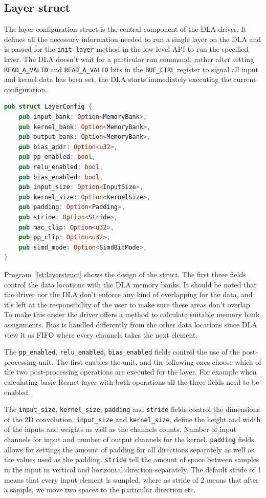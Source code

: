 \documentclass[12pt,a4paper,english
]{tunithesis}
\begin{document}
\subsection{Layer struct}
The layer configuration struct is the central component of the DLA driver. It defines all the necessary information needed to run a single layer on the DLA and is passed for the \texttt{init\_layer} method in the low level API to run the specified layer. The DLA doesn't wait for a particular run command, rather after setting \texttt{READ\_A\_VALID} and \texttt{READ\_A\_VALID} bits in the \texttt{BUF\_CTRL} register to signal all input and kernel data has been set, the DLA starts immediately executing the current configuration.

\begin{lstlisting}[language=Rust, basicstyle=\footnotesize, caption={Example call to DLA highlevel API}, label={lst:layerstruct}]
pub struct LayerConfig {
    pub input_bank: Option<MemoryBank>,
    pub kernel_bank: Option<MemoryBank>,
    pub output_bank: Option<MemoryBank>,
    pub bias_addr: Option<u32>,
    pub pp_enabled: bool,
    pub relu_enabled: bool,
    pub bias_enabled: bool,
    pub input_size: Option<InputSize>,
    pub kernel_size: Option<KernelSize>,
    pub padding: Option<Padding>,
    pub stride: Option<Stride>,
    pub mac_clip: Option<u32>,
    pub pp_clip: Option<u32>,
    pub simd_mode: Option<SimdBitMode>,
}
\end{lstlisting}

Program~\ref{lst:layerstruct} shows the design of the struct. The first three fields control the data locations with the DLA memory banks. It should be noted that the driver nor the DLA don't enforce any kind of overlapping for the data, and it's left at the responsibility of the user to make sure these areas don't overlap. To make this easier the driver offers a method to calculate suitable memory bank assignments. Bias is handled differently from the other data locations since DLA view it as FIFO where every channels takes the next element.

The \texttt{pp\_enabled}, \texttt{relu\_enabled}, \texttt{bias\_enabled} fields control the use of the post-processing unit. The first enables the unit, and the following ones choose which of the two post-processing operations are executed for the layer. For example when calculating basic Resnet layer with both operations all the three fields need to be enabled.

The \texttt{input\_size}, \texttt{kernel\_size}, \texttt{padding} and \texttt{stride} fields control the dimensions of the 2D convolution. \texttt{input\_size} and \texttt{kernel\_size}, define the height and width of the inputs and weights as well as the channels counts. Number of input channels for input and number of output channels for the kernel. \texttt{padding} fields allows for settings the amount of padding for all directions separately as well as the values used as the padding. \texttt{stride} tell the amount of space between samples in the input in vertical and horizontal direction separately. The default stride of 1 means that every input element is sampled, where as stride of 2 means that after a sample, we move two spaces to the particular direction etc.
\end{document}
